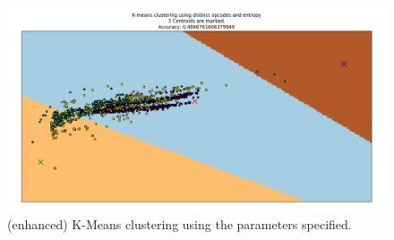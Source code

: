 \documentclass[12pt]{article}
\begin{document}
\begin{figure}[H]
\centering
\includegraphics[width=\textwidth]{kmeans2.png}
\caption{(enhanced) K-Means clustering using the parameters specified.}
\end{figure}
\end{document}
